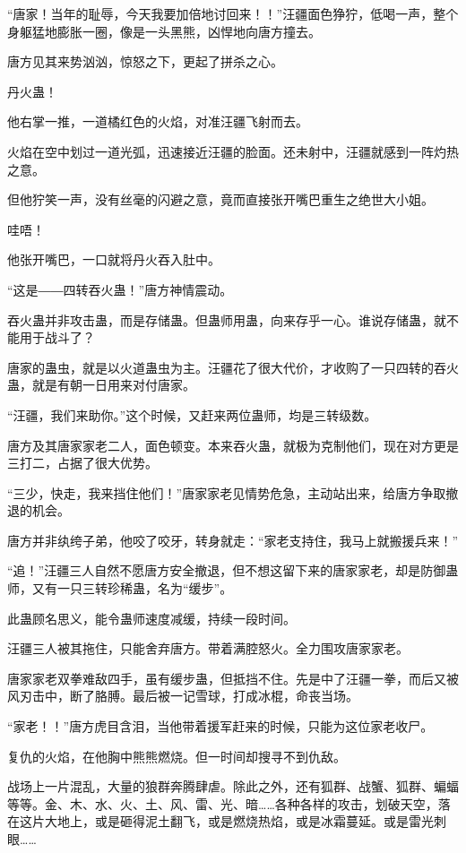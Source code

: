 
\begin{this_body}

“唐家！当年的耻辱，今天我要加倍地讨回来！！”汪疆面色狰狞，低喝一声，整个身躯猛地膨胀一圈，像是一头黑熊，凶悍地向唐方撞去。

唐方见其来势汹汹，惊怒之下，更起了拼杀之心。

丹火蛊！

他右掌一推，一道橘红色的火焰，对准汪疆飞射而去。

火焰在空中划过一道光弧，迅速接近汪疆的脸面。还未射中，汪疆就感到一阵灼热之意。

但他狞笑一声，没有丝毫的闪避之意，竟而直接张开嘴巴重生之绝世大小姐。

哇唔！

他张开嘴巴，一口就将丹火吞入肚中。

“这是――四转吞火蛊！”唐方神情震动。

吞火蛊并非攻击蛊，而是存储蛊。但蛊师用蛊，向来存乎一心。谁说存储蛊，就不能用于战斗了？

唐家的蛊虫，就是以火道蛊虫为主。汪疆花了很大代价，才收购了一只四转的吞火蛊，就是有朝一日用来对付唐家。

“汪疆，我们来助你。”这个时候，又赶来两位蛊师，均是三转级数。

唐方及其唐家家老二人，面色顿变。本来吞火蛊，就极为克制他们，现在对方更是三打二，占据了很大优势。

“三少，快走，我来挡住他们！”唐家家老见情势危急，主动站出来，给唐方争取撤退的机会。

唐方并非纨绔子弟，他咬了咬牙，转身就走：“家老支持住，我马上就搬援兵来！”

“追！”汪疆三人自然不愿唐方安全撤退，但不想这留下来的唐家家老，却是防御蛊师，又有一只三转珍稀蛊，名为“缓步”。

此蛊顾名思义，能令蛊师速度减缓，持续一段时间。

汪疆三人被其拖住，只能舍弃唐方。带着满腔怒火。全力围攻唐家家老。

唐家家老双拳难敌四手，虽有缓步蛊，但抵挡不住。先是中了汪疆一拳，而后又被风刃击中，断了胳膊。最后被一记雪球，打成冰棍，命丧当场。

“家老！！”唐方虎目含泪，当他带着援军赶来的时候，只能为这位家老收尸。

复仇的火焰，在他胸中熊熊燃烧。但一时间却搜寻不到仇敌。

战场上一片混乱，大量的狼群奔腾肆虐。除此之外，还有狐群、战蟹、狐群、蝙蝠等等。金、木、水、火、土、风、雷、光、暗……各种各样的攻击，划破天空，落在这片大地上，或是砸得泥土翻飞，或是燃烧热焰，或是冰霜蔓延。或是雷光刺眼……


\end{this_body}
